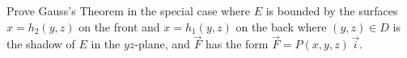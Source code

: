 \documentclass[11pt,letterpaper,cm]{nupset}
\begin{document}
\newpage

\begin{problem}[Exercise 10] Prove Gauss's Theorem in the special case where $E$ is bounded by the surfaces $x=h_2(y,z)$ on the front and $x=h_1(y,z)$ on the back where $(y,z) \in D$ is the shadow of $E$ in the $yz$-plane, and $\vec{F}$ has the form $\vec{F} = P(x,y,z)\,\vec{i}$.
\end{problem}
\begin{solution}
\end{solution}
\end{document}
